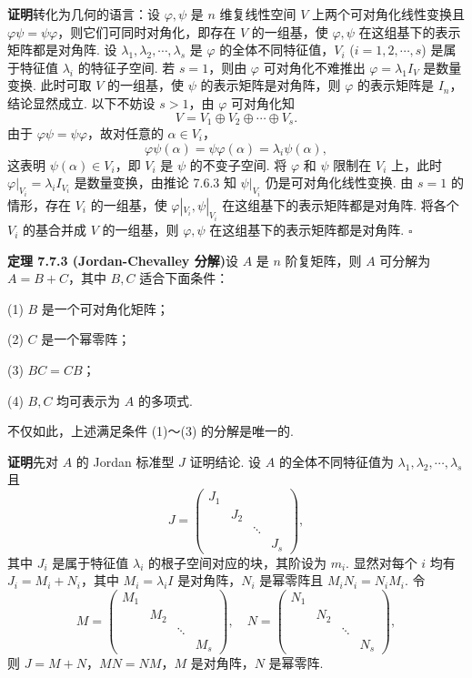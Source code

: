 \documentclass[UTF8, 12pt, fontset=fandol, oneside]{ctexart}
\begin{document}
\noindent\textbf{证明}\quad 转化为几何的语言：设 $\varphi,\psi$ 是 $n$ 维复线性空间 $V$ 上两个可对角化线性变换且 $\varphi\psi=\psi\varphi$，则它们可同时对角化，即存在 $V$ 的一组基，使 $\varphi,\psi$ 在这组基下的表示矩阵都是对角阵. 设 $\lambda_1,\lambda_2,\cdots,\lambda_s$ 是 $\varphi$ 的全体不同特征值，$V_i$ ($i=1,2,\cdots,s$) 是属于特征值 $\lambda_i$ 的特征子空间. 若 $s=1$，则由 $\varphi$ 可对角化不难推出 $\varphi=\lambda_1I_V$ 是数量变换. 此时可取 $V$ 的一组基，使 $\psi$ 的表示矩阵是对角阵，则 $\varphi$ 的表示矩阵是 $I_n$，结论显然成立. 以下不妨设 $s>1$，由 $\varphi$ 可对角化知
\[
V=V_1\oplus V_2\oplus\cdots\oplus V_s.
\]
由于 $\varphi\psi=\psi\varphi$，故对任意的 $\alpha\in V_i$，
\[
\varphi\psi(\alpha)=\psi\varphi(\alpha)=\lambda_i\psi(\alpha),
\]
这表明 $\psi(\alpha)\in V_i$，即 $V_i$ 是 $\psi$ 的不变子空间. 将 $\varphi$ 和 $\psi$ 限制在 $V_i$ 上，此时 $\varphi|_{V_i}=\lambda_iI_{V_i}$ 是数量变换，由推论 7.6.3 知 $\psi|_{V_i}$ 仍是可对角化线性变换. 由 $s=1$ 的情形，存在 $V_i$ 的一组基，使 $\varphi|_{V_i},\psi|_{V_i}$ 在这组基下的表示矩阵都是对角阵. 将各个 $V_i$ 的基合并成 $V$ 的一组基，则 $\varphi,\psi$ 在这组基下的表示矩阵都是对角阵. $\square$

\noindent\textbf{定理 7.7.3 (Jordan-Chevalley 分解)}\quad 设 $A$ 是 $n$ 阶复矩阵，则 $A$ 可分解为 $A=B+C$，其中 $B,C$ 适合下面条件：

(1) $B$ 是一个可对角化矩阵；

(2) $C$ 是一个幂零阵；

(3) $BC=CB$；

(4) $B,C$ 均可表示为 $A$ 的多项式.

不仅如此，上述满足条件 (1)～(3) 的分解是唯一的.

\noindent\textbf{证明}\quad 先对 $A$ 的 Jordan 标准型 $J$ 证明结论. 设 $A$ 的全体不同特征值为 $\lambda_1,\lambda_2,\cdots,\lambda_s$ 且
\[
J=\left(\begin{array}{cccc}
J_1 & & & \\
& J_2 & & \\
& & \ddots & \\
& & & J_s
\end{array}\right),
\]
其中 $J_i$ 是属于特征值 $\lambda_i$ 的根子空间对应的块，其阶设为 $m_i$. 显然对每个 $i$ 均有 $J_i=M_i+N_i$，其中 $M_i=\lambda_iI$ 是对角阵，$N_i$ 是幂零阵且 $M_iN_i=N_iM_i$. 令
\[
M=\left(\begin{array}{cccc}
M_1 & & & \\
& M_2 & & \\
& & \ddots & \\
& & & M_s
\end{array}\right),\quad
N=\left(\begin{array}{cccc}
N_1 & & & \\
& N_2 & & \\
& & \ddots & \\
& & & N_s
\end{array}\right),
\]
则 $J=M+N$，$MN=NM$，$M$ 是对角阵，$N$ 是幂零阵.
\end{document}

